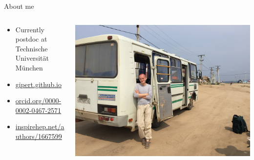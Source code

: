 \documentclass[10pt,aspectratio=169]{beamer}
\institute{Universit\`a degli Studi di Padova / INFN Padova}
\title{\mytitle}
\date{\place\ \sep\ \mydate}
\author{\people}
\begin{document}
\maketitle
\begin{frame}{About me}
  \begin{columns}
    \begin{column}{0.45\textwidth}
      \begin{itemize}
        \item Currently postdoc at Technische Universit\"at M\"unchen
        \item \href{https://gipert.github.io}{gipert.github.io}
        \item \href{https://orcid.org/0000-0002-0467-2571}{orcid.org/0000-0002-0467-2571}
        \item \href{https://inspirehep.net/authors/1667599}{inspirehep.net/authors/1667599}
      \end{itemize}
    \end{column}
    \begin{column}{0.55\textwidth}
      \vspace*{5mm}
      \includegraphics[trim=0 0 0 0,clip,width=\columnwidth]{me-siberia.jpg}
    \end{column}
  \end{columns}
\end{frame}
\end{document}
